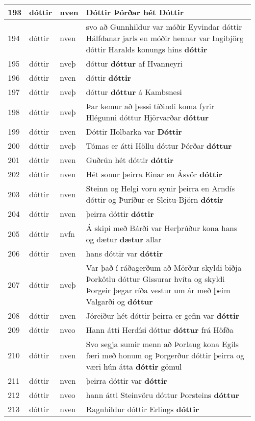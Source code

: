 \documentclass{article}
\begin{document}
\begin{longtable}{p{1cm}|p{1cm}|p{1cm}|p{13cm}}
\hline
193&dóttir&nven&Dóttir Þórðar hét \textbf{Dóttir} \\
\hline
194&dóttir&nven&svo að Gunnhildur var móðir Eyvindar dóttir Hálfdanar jarls en móðir hennar var Ingibjörg dóttir Haralds konungs hins \textbf{dóttir} \\
\hline
195&dóttir&nveþ&dóttur \textbf{dóttur} af Hvanneyri\\
\hline
196&dóttir&nven&dóttir \textbf{dóttir} \\
\hline
197&dóttir&nveþ&dóttur \textbf{dóttur} á Kambsnesi\\
\hline
198&dóttir&nveþ&Þar kemur að þessi tíðindi koma fyrir Hlégunni dóttur Hjörvarðar \textbf{dóttur} \\
\hline
199&dóttir&nven&Dóttir Holbarka var \textbf{Dóttir} \\
\hline
200&dóttir&nveþ&Tómas er átti Höllu dóttur Þórðar \textbf{dóttur} \\
\hline
201&dóttir&nven&Guðrún hét dóttir \textbf{dóttir} \\
\hline
202&dóttir&nven&Hét sonur þeirra Einar en Ásvör \textbf{dóttir} \\
\hline
203&dóttir&nven&Steinn og Helgi voru synir þeirra en Arndís dóttir og Þuríður er Sleitu-Björn \textbf{dóttir} \\
\hline
204&dóttir&nven&þeirra dóttir \textbf{dóttir} \\
\hline
205&dóttir&nvfn&Á skipi með Bárði var Herþrúður kona hans og dætur \textbf{dætur} allar\\
\hline
206&dóttir&nven&hans dóttir var \textbf{dóttir} \\
\hline
207&dóttir&nveþ&Var það í ráðagerðum að Mörður skyldi biðja Þorkötlu dóttur Gissurar hvíta og skyldi Þorgeir þegar ríða vestur um ár með þeim Valgarði og \textbf{dóttur} \\
\hline
208&dóttir&nven&Jóreiður hét dóttir þeirra er gefin var \textbf{dóttir} \\
\hline
209&dóttir&nveo&Hann átti Herdísi dóttur \textbf{dóttur} frá Höfða\\
\hline
210&dóttir&nven&Svo segja sumir menn að Þorlaug kona Egils færi með honum og Þorgerður dóttir þeirra og væri hún átta \textbf{dóttir} gömul\\
\hline
211&dóttir&nven&þeirra dóttir var \textbf{dóttir} \\
\hline
212&dóttir&nveo&hann átti Steinvöru dóttur Þorsteins \textbf{dóttur} \\
\hline
213&dóttir&nven&Ragnhildur dóttir Erlings \textbf{dóttir} \\

\end{longtable}
\end{document}
